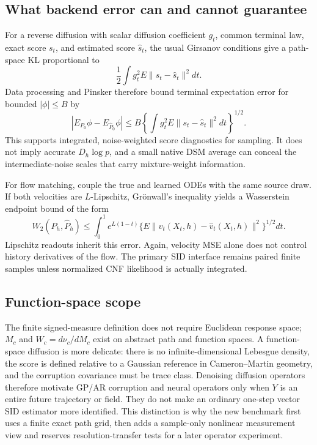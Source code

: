 \documentclass[10pt]{article}
\begin{document}
\subsection{What backend error can and cannot guarantee}

For a reverse diffusion with scalar diffusion coefficient $g_t$, common terminal
law, exact score $s_t$, and estimated score $\widehat s_t$, the usual Girsanov
conditions give a path-space KL proportional to
\[
 \frac12\int g_t^2E\|s_t-\widehat s_t\|^2dt.
\]
Data processing and Pinsker therefore bound terminal expectation error for
bounded $|\phi|\leq B$ by
\[
 \left|E_{P_0}\phi-E_{\widehat P_0}\phi\right|
 \leq B\left\{\int g_t^2E\|s_t-\widehat s_t\|^2dt\right\}^{1/2}.
\]
This supports integrated, noise-weighted score diagnostics for sampling.  It does
not imply accurate $D_h\log p$, and a small native DSM average can conceal the
intermediate-noise scales that carry mixture-weight information.

For flow matching, couple the true and learned ODEs with the same source draw.
If both velocities are $L$-Lipschitz, Gr\"onwall's inequality yields a
Wasserstein endpoint bound of the form
\[
 W_2(P_h,\widehat P_h)
 \leq\int_0^1 e^{L(1-t)}
 \{E\|v_t(X_t,h)-\widehat v_t(X_t,h)\|^2\}^{1/2}dt.
\]
Lipschitz readouts inherit this error.  Again, velocity MSE alone does not control
history derivatives of the flow.  The primary SID interface remains paired finite
samples unless normalized CNF likelihood is actually integrated.

\subsection{Function-space scope}

The finite signed-measure definition does not require Euclidean response space;
$M_c$ and $W_c=d\nu_c/dM_c$ exist on abstract path and function spaces.  A
function-space diffusion is more delicate: there is no infinite-dimensional
Lebesgue density, the score is defined relative to a Gaussian reference in
Cameron--Martin geometry, and the corruption covariance must be trace class.
Denoising diffusion operators therefore motivate GP/AR corruption and neural
operators only when $Y$ is an entire future trajectory or field.  They do not
make an ordinary one-step vector SID estimator more identified.  This distinction
is why the new benchmark first uses a finite exact path grid, then adds a
sample-only nonlinear measurement view and reserves resolution-transfer tests for
a later operator experiment.
\end{document}
